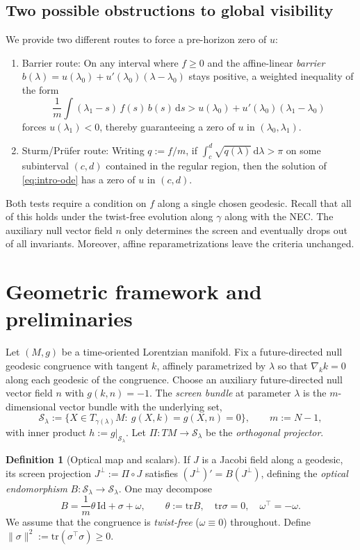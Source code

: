 \documentclass[a4paper, reqno]{amsart}
\numberwithin{equation}{section}
\theoremstyle{plain}
\theoremstyle{definition}
\newtheorem{definition}[theorem]{Definition}
\theoremstyle{remark}
\newcommand{\dd}{\mathrm{d}}
\newcommand{\Id}{\mathrm{Id}}
\newcommand{\tr}{\mathrm{tr}}
\newcommand{\lam}{\lambda}
\begin{document}
\subsection{Two possible obstructions to global visibility}
We provide two different routes to force a pre-horizon zero of $u$:
\begin{enumerate}[leftmargin=2em]
\item Barrier route: On any interval where $f\ge 0$ and the affine-linear \emph{barrier} $b(\lambda)=u(\lambda_0)+u'(\lambda_0)(\lambda-\lambda_0)$ stays positive, a weighted inequality of the form
$$\frac{1}{m}\int (\lambda_1-s)\,f(s)\,b(s)\,\dd s>u(\lambda_0)+u'(\lambda_0)(\lambda_1-\lambda_0)$$
forces $u(\lambda_1)<0$, thereby guaranteeing a zero of $u$ in $(\lambda_0,\lambda_1)$.
\item Sturm/Prüfer route: Writing $q:=f/m$, if $\int_{c}^{d}\sqrt{q(\lambda)}\,\dd\lambda>\pi$ on some subinterval $(c,d)$ contained in the regular region, then the solution of \eqref{eq:intro-ode} has a zero of $u$ in $(c,d)$.
\end{enumerate}
Both tests require a condition on $f$ along a single chosen geodesic. Recall that all of this holds under the twist-free evolution along $\gamma$ along with the NEC. The auxiliary null vector field $n$ only determines the screen and eventually drops out of all invariants. Moreover, affine reparametrizations leave the criteria unchanged.

\section{Geometric framework and preliminaries}\label{sec:framework}

Let $(M,g)$ be a time-oriented Lorentzian manifold. Fix a future-directed null geodesic congruence with tangent $k$, affinely parametrized by $\lam$ so that $\nabla_k k=0$ along each geodesic of the congruence. Choose an auxiliary future-directed null vector field $n$ with $g(k,n)=-1$. The \emph{screen bundle} at parameter $\lam$ is the $m$-dimensional vector bundle with the underlying set,
$$\mathcal S_\lam:=\{X\in T_{\gamma(\lam)}M:\ g(X,k)=g(X,n)=0\},\qquad m:=N-1,$$
with inner product $h:=g|_{\mathcal S_\lam}$. Let $\Pi:T M\to \mathcal S_\lam$ be the \emph{orthogonal projector}.

\begin{definition}[Optical map and scalars]\label{def:optical}
If $J$ is a Jacobi field along a geodesic, its screen projection $J^\perp:=\Pi\circ J$ satisfies $(J^\perp)'=B(J^\perp)$, defining the \emph{optical endomorphism} $B:\mathcal S_\lam\to \mathcal S_\lam$. One may decompose
$$B=\frac{1}{m}\theta\,\Id+\sigma+\omega,\qquad \theta:=\tr B,\quad \tr\sigma=0,\quad \omega^\top=-\omega.$$
We assume that the congruence is \emph{twist-free} ($\omega\equiv 0$) throughout. Define $\|\sigma\|^2:=\tr(\sigma^\top\sigma)\ge 0$.
\end{definition}
\end{document}

